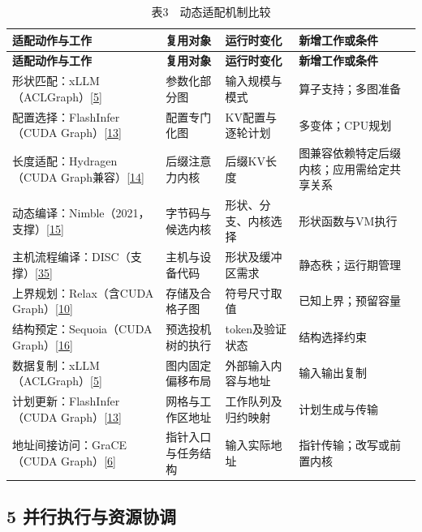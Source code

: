 \documentclass[UTF8,11pt,fontset=windows]{ctexart}
\begin{document}
\begingroup\small
\begin{longtable}[]{@{}>{\raggedright\arraybackslash}p{}>{\raggedright\arraybackslash}p{}>{\raggedright\arraybackslash}p{}>{\raggedright\arraybackslash}p{}@{}}
\caption{表3　动态适配机制比较}\tabularnewline
\toprule
\textbf{适配动作与工作} & \textbf{复用对象} & \textbf{运行时变化} & \textbf{新增工作或条件} \\
\midrule
\endfirsthead
\toprule
\textbf{适配动作与工作} & \textbf{复用对象} & \textbf{运行时变化} & \textbf{新增工作或条件} \\
\midrule
\endhead
形状匹配：xLLM（ACLGraph）\protect\hyperlink{ref-5}{{[}5{]}} & 参数化部分图 & 输入规模与模式 & 算子支持；多图准备 \\
配置选择：FlashInfer（CUDA Graph）\protect\hyperlink{ref-13}{{[}13{]}} & 配置专门化图 & KV配置与逐轮计划 & 多变体；CPU规划 \\
长度适配：Hydragen（CUDA Graph兼容）\protect\hyperlink{ref-14}{{[}14{]}} & 后缀注意力内核 & 后缀KV长度 & 图兼容依赖特定后缀内核；应用需给定共享关系 \\
动态编译：Nimble（2021，支撑）\protect\hyperlink{ref-15}{{[}15{]}} & 字节码与候选内核 & 形状、分支、内核选择 & 形状函数与VM执行 \\
主机流程编译：DISC（支撑）\protect\hyperlink{ref-35}{{[}35{]}} & 主机与设备代码 & 形状及缓冲区需求 & 静态秩；运行期管理 \\
上界规划：Relax（含CUDA Graph）\protect\hyperlink{ref-10}{{[}10{]}} & 存储及合格子图 & 符号尺寸取值 & 已知上界；预留容量 \\
结构预定：Sequoia（CUDA Graph）\protect\hyperlink{ref-16}{{[}16{]}} & 预选投机树的执行 & token及验证状态 & 结构选择约束 \\
数据复制：xLLM（ACLGraph）\protect\hyperlink{ref-5}{{[}5{]}} & 图内固定偏移布局 & 外部输入内容与地址 & 输入输出复制 \\
计划更新：FlashInfer（CUDA Graph）\protect\hyperlink{ref-13}{{[}13{]}} & 网格与工作区地址 & 工作队列及归约映射 & 计划生成与传输 \\
地址间接访问：GraCE（CUDA Graph）\protect\hyperlink{ref-6}{{[}6{]}} & 指针入口与任务结构 & 输入实际地址 & 指针传输；改写或前置内核 \\
\bottomrule
\end{longtable}
\endgroup

\hypertarget{section-5}{%
\subsection{5 并行执行与资源协调}\label{section-5}}
\end{document}
